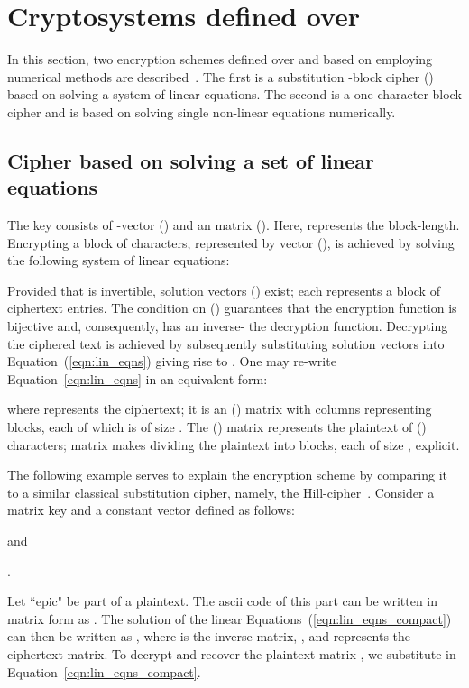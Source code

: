 \documentclass[10pt,journal]{IEEEtran}
\begin{document}
\section{Cryptosystems defined over } 
\label{sec:the_ciphers}
In this section, two encryption schemes defined over 
and based on employing numerical methods are described~\cite{hassoun-2014}.  
The first is a substitution -block cipher () based on solving 
a system of  linear equations. The second is a one-character block 
cipher and is based on solving single non-linear equations numerically.

\subsection{Cipher based on solving a set of linear equations} 
The key consists of -vector () and an  matrix
(). Here,  represents the block-length. Encrypting a block
of  characters, represented by vector (), is achieved by
solving the following system of linear equations:



Provided that  is invertible, solution vectors ()
exist; each represents a block of  ciphertext entries.  The
condition on () guarantees that the encryption function is
bijective and, consequently, has an inverse- the decryption function.
Decrypting the ciphered text is achieved by subsequently substituting
solution vectors into Equation~(\ref{eqn:lin_eqns}) giving rise to
.  One may re-write
Equation~\ref{eqn:lin_eqns} in an equivalent form:
 


where  represents the ciphertext; it is an ()
matrix with  columns representing blocks, each of which is of size
. The () matrix  represents the plaintext of
() characters; matrix  makes dividing the plaintext into
blocks, each of size , explicit.
\newline

The following example serves to explain the encryption scheme by
comparing it to a similar classical substitution cipher, namely, the
Hill-cipher~\cite{hill-1929}. Consider a  matrix key and a
constant vector defined as follows:
\begin{center}  and  \end{center}.

Let ``epic" be part of a plaintext. The ascii code of this part can be
written in matrix form as . The solution of the linear
  Equations~(\ref{eqn:lin_eqns_compact}) can then be written as
  , where  is
  the inverse matrix,
  , and  represents the
    ciphertext matrix. To decrypt and recover the plaintext matrix
    , we substitute  in
    Equation~\ref{eqn:lin_eqns_compact}.
\newline
\end{document}
